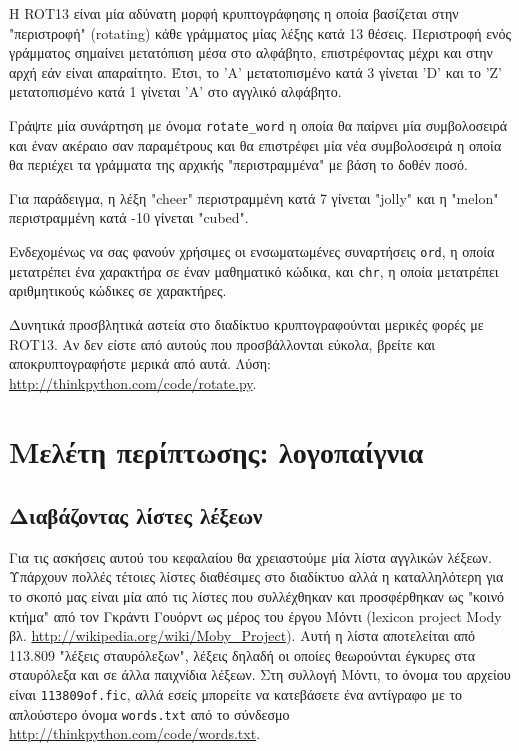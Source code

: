 \documentclass[10pt]{book}
\begin{document}
\begin{exercise}

\label{exrotate}
Η ROT13 είναι μία αδύνατη μορφή κρυπτογράφησης η οποία βασίζεται στην "περιστροφή" (rotating) κάθε γράμματος μίας λέξης κατά 13 θέσεις. Περιστροφή ενός γράμματος σημαίνει μετατόπιση μέσα στο αλφάβητο, επιστρέφοντας μέχρι και στην αρχή εάν είναι απαραίτητο. Έτσι, το 'A' μετατοπισμένο κατά 3 γίνεται 'D' και το 'Z' μετατοπισμένο κατά 1 γίνεται 'A' στο αγγλικό αλφάβητο.

Γράψτε μία συνάρτηση με όνομα \verb"rotate_word" η οποία θα παίρνει μία συμβολοσειρά και έναν ακέραιο σαν παραμέτρους και θα επιστρέφει μία νέα συμβολοσειρά η οποία θα περιέχει τα γράμματα της αρχικής "περιστραμμένα" με βάση το δοθέν ποσό.

Για παράδειγμα, η λέξη "cheer" περιστραμμένη κατά 7 γίνεται "jolly" και η "melon" περιστραμμένη κατά -10 γίνεται "cubed". 


Ενδεχομένως να σας φανούν χρήσιμες οι ενσωματωμένες συναρτήσεις {\tt ord}, η οποία μετατρέπει ένα χαρακτήρα σε έναν μαθηματικό κώδικα, και {\tt chr}, η οποία μετατρέπει αριθμητικούς κώδικες σε χαρακτήρες.

Δυνητικά προσβλητικά αστεία στο διαδίκτυο κρυπτογραφούνται μερικές φορές με  ROT13. Αν δεν είστε 
από αυτούς που προσβάλλονται εύκολα, βρείτε και αποκρυπτογραφήστε μερικά από αυτά. Λύση: \url{http://thinkpython.com/code/rotate.py}. 

\end{exercise}



\chapter{Μελέτη περίπτωσης: λογοπαίγνια}

\section{Διαβάζοντας λίστες λέξεων}
\label{wordlist}

Για τις ασκήσεις αυτού του κεφαλαίου θα χρειαστούμε μία λίστα αγγλικών λέξεων. Υπάρχουν πολλές τέτοιες λίστες διαθέσιμες στο διαδίκτυο αλλά η καταλληλότερη για το σκοπό μας είναι μία από τις λίστες που συλλέχθηκαν και προσφέρθηκαν ως  "κοινό κτήμα" από τον Γκράντι Γουόρντ ως μέρος του έργου Μόντι (lexicon project Mody βλ. \url{http://wikipedia.org/wiki/Moby_Project}). Αυτή η λίστα αποτελείται από 113.809 "λέξεις σταυρόλεξων", λέξεις δηλαδή οι οποίες θεωρούνται έγκυρες στα σταυρόλεξα και σε άλλα παιχνίδια λέξεων. Στη συλλογή Μόντι, το όνομα του αρχείου είναι {\tt 113809of.fic}, αλλά εσείς μπορείτε να κατεβάσετε ένα αντίγραφο με το απλούστερο όνομα {\tt words.txt} από το σύνδεσμο  \url{http://thinkpython.com/code/words.txt}.
\end{document}
